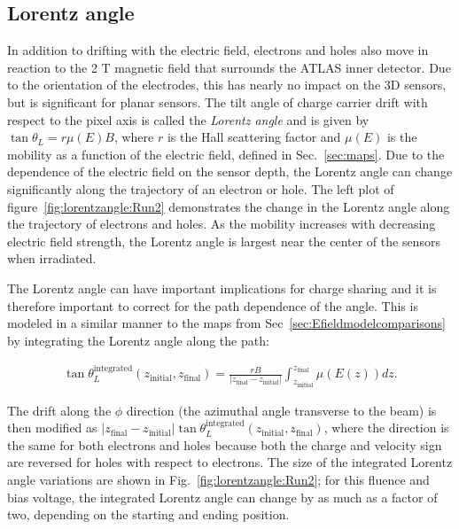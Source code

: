 \subsection{Lorentz angle}
\label{sec:mapsLorentz}

In addition to drifting with the electric field, electrons and holes also move in reaction to the 2 T magnetic field that surrounds the ATLAS inner detector.  Due to the orientation of the electrodes, this has nearly no impact on the 3D sensors, but is significant for planar sensors.  The tilt angle of charge carrier drift with respect to the pixel axis is called the \textit{Lorentz angle} and is given by $\tan\theta_L=r\mu(E) B$, where $r$ is the Hall scattering factor and $\mu(E)$ is the mobility as a function of the electric field, defined in Sec.~\ref{sec:maps}.  Due to the dependence of the electric field on the sensor depth, the Lorentz angle can change significantly along the trajectory of an electron or hole.  The left plot of figure~\ref{fig:lorentzangle:Run2} demonstrates the change in the Lorentz angle along the trajectory of electrons and holes.  As the mobility increases with decreasing electric field strength, the Lorentz angle is largest near the center of the sensors when irradiated.

The Lorentz angle can have important implications for charge sharing and it is therefore important to correct for the path dependence of the angle.  This is modeled in a similar manner to the maps from Sec~\ref{sec:Efieldmodelcomparisons} by integrating the Lorentz angle along the path:

\begin{align}
\label{eq:integratedlorentzangle}
\tan\theta_L^\text{integrated}(z_\text{initial},z_\text{final})=\frac{rB}{|z_\text{final}-z_\text{initial}|}\int_{z_\text{initial}}^{z_\text{final}}\mu(E(z)) dz.
\end{align}

The drift along the $\phi$ direction (the azimuthal angle transverse to the beam) is then modified as $|z_\text{final}-z_\text{initial}|\tan\theta_L^\text{integrated}(z_\text{initial},z_\text{final})$, where the direction is the same for both electrons and holes because both the charge and velocity sign are reversed for holes with respect to electrons. The size of the integrated Lorentz angle variations are shown in Fig.~\ref{fig:lorentzangle:Run2}; for this fluence and bias voltage, the integrated Lorentz angle can change by as much as a factor of two, depending on the starting and ending position.  

